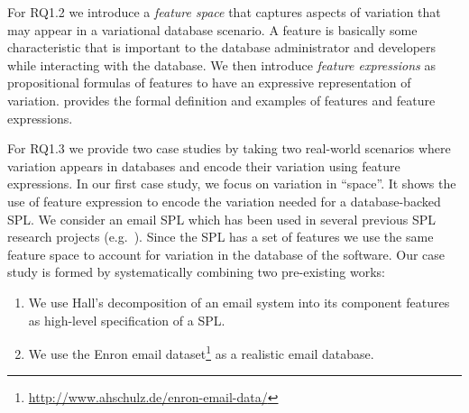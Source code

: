 \begin{comment}
* introduce a feature space
* propositional formulas of features
\end{comment}

For RQ1.2 we introduce a \emph{feature space} that captures aspects of 
variation that may appear in a variational database scenario. A feature is
basically some characteristic that is important to the database administrator
and developers while interacting with the database.
We then introduce \emph{feature expressions} as propositional formulas of
features to have an expressive representation of variation. 
 provides the formal definition and examples of
features and feature expressions.

\begin{comment}
* show case the applicability and feasibility of encoding instances of variation using feature expression
\end{comment}

For RQ1.3 we provide two case studies by taking 
two real-world scenarios where variation appears
in databases and encode their variation using feature expressions.
%
In our first case study, we focus on variation in ``space''.
It shows the use of feature expression to encode the variation
needed for a database-backed SPL. We consider an email
SPL which has been used in several previous SPL research projects (e.g.\
\cite{Apel13:SSP,AlHaj19}).
Since the SPL has a set of features we use the same feature space 
to account for variation in the database of the software.
%
%
Our case study is formed by systematically combining two pre-existing works:
%
\begin{enumerate}
%
\item 
We use Hall's decomposition of an email system into its component
features~\cite{Hall05} as high-level specification of a SPL.
%
\item 
We use the Enron email
dataset\footnote{\url{http://www.ahschulz.de/enron-email-data/}} as 
a realistic email database.
\end{enumerate}


